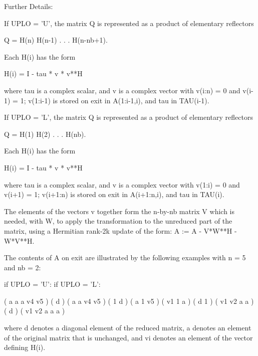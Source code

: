 \begin{DoxyParagraph}{Further Details\+: }
\begin{DoxyVerb}  If UPLO = 'U', the matrix Q is represented as a product of elementary
  reflectors

     Q = H(n) H(n-1) . . . H(n-nb+1).

  Each H(i) has the form

     H(i) = I - tau * v * v**H

  where tau is a complex scalar, and v is a complex vector with
  v(i:n) = 0 and v(i-1) = 1; v(1:i-1) is stored on exit in A(1:i-1,i),
  and tau in TAU(i-1).

  If UPLO = 'L', the matrix Q is represented as a product of elementary
  reflectors

     Q = H(1) H(2) . . . H(nb).

  Each H(i) has the form

     H(i) = I - tau * v * v**H

  where tau is a complex scalar, and v is a complex vector with
  v(1:i) = 0 and v(i+1) = 1; v(i+1:n) is stored on exit in A(i+1:n,i),
  and tau in TAU(i).

  The elements of the vectors v together form the n-by-nb matrix V
  which is needed, with W, to apply the transformation to the unreduced
  part of the matrix, using a Hermitian rank-2k update of the form:
  A := A - V*W**H - W*V**H.

  The contents of A on exit are illustrated by the following examples
  with n = 5 and nb = 2:

  if UPLO = 'U':                       if UPLO = 'L':

    (  a   a   a   v4  v5 )              (  d                  )
    (      a   a   v4  v5 )              (  1   d              )
    (          a   1   v5 )              (  v1  1   a          )
    (              d   1  )              (  v1  v2  a   a      )
    (                  d  )              (  v1  v2  a   a   a  )

  where d denotes a diagonal element of the reduced matrix, a denotes
  an element of the original matrix that is unchanged, and vi denotes
  an element of the vector defining H(i).\end{DoxyVerb}
 
\end{DoxyParagraph}
